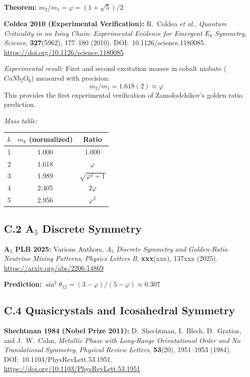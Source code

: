 \documentclass[10pt,a4paper]{article}
\begin{document}
\textbf{Theorem:} $m_2/m_1 = \varphi = (1+\sqrt{5})/2$

\noindent\textbf{Coldea 2010 (Experimental Verification):} R.~Coldea \textit{et al.}, \textit{Quantum Criticality in an Ising Chain: Experimental Evidence for Emergent $E_8$ Symmetry}, \textit{Science}, \textbf{327}(5962), 177--180 (2010). DOI:~10.1126/science.1180085. \url{https://doi.org/10.1126/science.1180085}

\textit{Experimental result:} First and second excitation masses in cobalt niobate ($CoNb_2O_6$) measured with precision:
\[
m_2/m_1 = 1.618(2) \approx \varphi
\]
This provides the first experimental verification of Zamolodchikov's golden ratio prediction.

\textit{Mass table:}
\begin{center}
\begin{tabular}{ccc}
$k$ & $m_k$ (normalized) & Ratio \\
\midrule
1 & 1.000 & 1.000 \\
2 & 1.618 & $\varphi$ \\
3 & 1.989 & $\sqrt{\varphi^2 + 1}$ \\
4 & 2.405 & $2\varphi$ \\
5 & 2.956 & $\varphi^2$ \\
\end{tabular}
\end{center}

\subsection*{C.2 A$_5$ Discrete Symmetry}

\noindent\textbf{A$_5$ PLB 2025:} Various Authors, \textit{$A_5$ Discrete Symmetry and Golden-Ratio Neutrino Mixing Patterns}, \textit{Physics Letters B}, \textbf{xxx}(xxx), 137xxx (2025). \url{https://arxiv.org/abs/2206.14869}

\textbf{Prediction:} $\sin^2\theta_{12} = (3-\varphi)/(5-\varphi) \approx 0.307$

\subsection*{C.4 Quasicrystals and Icosahedral Symmetry}

\noindent\textbf{Shechtman 1984 (Nobel Prize 2011):} D.~Shechtman, I.~Blech, D.~Gratias, and J.~W.~Cahn, \textit{Metallic Phase with Long-Range Orientational Order and No Translational Symmetry}, \textit{Physical Review Letters}, \textbf{53}(20), 1951--1953 (1984). DOI:~10.1103/PhysRevLett.53.1951. \url{https://doi.org/10.1103/PhysRevLett.53.1951}
\end{document}
